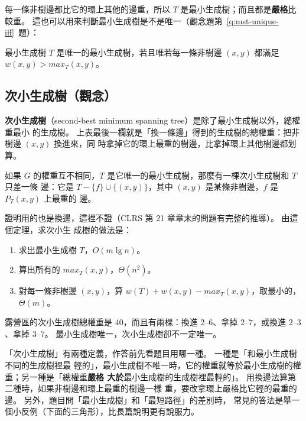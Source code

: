 每一條非樹邊都比它的環上其他的邊重，所以 $T$ 是最小生成樹；而且都是\textbf{嚴格}比較重。
這也可以用來判斷最小生成樹是不是唯一（觀念題第~\ref{q:mst-unique-iff}~題）：

\begin{corollary}
\label{cor:mst-unique-iff}
最小生成樹 $T$ 是唯一的最小生成樹，若且唯若每一條非樹邊 $(x, y)$ 都滿足 $w(x, y) >
\mathit{max}_T(x, y)$。
\end{corollary}

\subsection{次小生成樹（觀念）}
\label{sec:mst-second}

\textbf{次小生成樹}（second-best minimum spanning tree）是除了最小生成樹以外，總權重最小
的生成樹。 上表最後一欄就是「換一條邊」得到的生成樹的總權重：把非樹邊 $(x, y)$ 換進來，同
時拿掉它的環上最重的樹邊，比拿掉環上其他樹邊都划算。

\begin{theorem}
\label{thm:mst-second}
如果 $G$ 的權重互不相同，$T$ 是它唯一的最小生成樹，那麼有一棵次小生成樹和 $T$ 只差一條
邊：它是 $T - \{f\} \cup \{(x, y)\}$，其中 $(x, y)$ 是某條非樹邊，$f$ 是 $P_T(x, y)$ 上最重的
邊。
\end{theorem}

證明用的也是換邊，這裡不證（CLRS 第 21 章章末的問題有完整的推導）。 由這個定理，求次小生
成樹的做法是：

\begin{enumerate}
\item 求出最小生成樹 $T$，$O(m \lg n)$。
\item 算出所有的 $\mathit{max}_T(x, y)$，$\Theta(n^2)$。
\item 對每一條非樹邊 $(x, y)$，算 $w(T) + w(x, y) - \mathit{max}_T(x, y)$，取最小的，$\Theta(m)$。
\end{enumerate}

露營區的次小生成樹總權重是 $40$，而且有兩棵：換進 $2$--$6$、拿掉 $2$--$7$，或換進
$2$--$3$、拿掉 $3$--$7$。 最小生成樹唯一，次小生成樹卻不一定唯一。

\begin{examnote}
「次小生成樹」有兩種定義，作答前先看題目用哪一種。 一種是「和最小生成樹不同的生成樹裡最
輕的」，最小生成樹不唯一時，它的權重就等於最小生成樹的權重；另一種是「總權重\textbf{嚴格
大於}最小生成樹的生成樹裡最輕的」。 用換邊法算第二種時，如果非樹邊和環上最重的樹邊一樣
重，要改拿環上嚴格比它輕的最重的邊。 另外，題目問「最小生成樹」和「最短路徑」的差別時，
常見的答法是舉一個小反例（下面的三角形），比長篇說明更有說服力。
\end{examnote}

